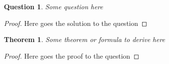 \documentclass[a4paper,11pt]{book}
\newtheorem{theorem}{Theorem}
\newtheorem{question}{Question}
\newenvironment{solution}{\renewcommand{\proofname}{Solution}\begin{proof}}{\end{proof}}
\begin{document}
\begin{question}
Some question here
\end{question}

\begin{solution}
Here goes the solution to the question
\end{solution}

\begin{theorem}
Some theorem or formula to derive here
\end{theorem}

\begin{proof}
Here goes the proof to the question
\end{proof}
\end{document}
